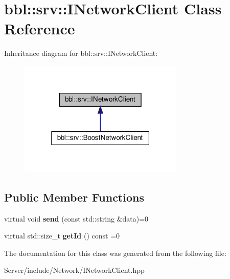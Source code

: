 \hypertarget{classbbl_1_1srv_1_1_i_network_client}{}\section{bbl\+:\+:srv\+:\+:I\+Network\+Client Class Reference}
\label{classbbl_1_1srv_1_1_i_network_client}


Inheritance diagram for bbl\+:\+:srv\+:\+:I\+Network\+Client\+:
\nopagebreak
\begin{figure}[H]
\begin{center}
\leavevmode
\includegraphics[width=223pt]{classbbl_1_1srv_1_1_i_network_client__inherit__graph}
\end{center}
\end{figure}
\subsection*{Public Member Functions}
\begin{DoxyCompactItemize}
\item 
\mbox{\label{classbbl_1_1srv_1_1_i_network_client_a54d56630a807c03ffa8095299af90cc4}} 
virtual void {\bfseries send} (const std\+::string \&data)=0
\item 
\mbox{\label{classbbl_1_1srv_1_1_i_network_client_a7cae0fd649ec77fb2a7ff29e4288b916}} 
virtual std\+::size\+\_\+t {\bfseries get\+Id} () const =0
\end{DoxyCompactItemize}


The documentation for this class was generated from the following file\+:\begin{DoxyCompactItemize}
\item 
Server/include/\+Network/I\+Network\+Client.\+hpp\end{DoxyCompactItemize}
